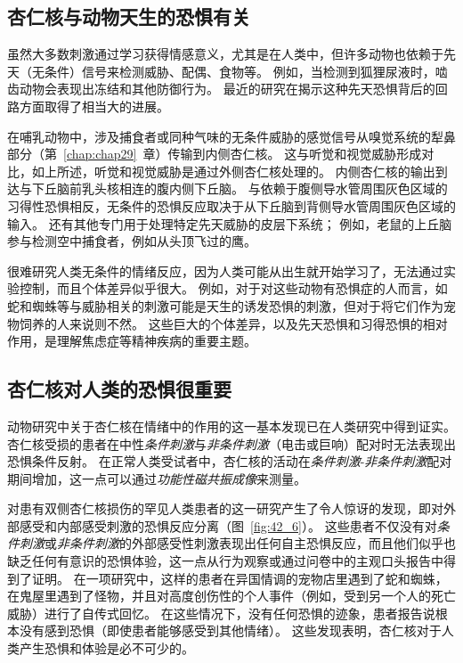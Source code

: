 \subsection{杏仁核与动物天生的恐惧有关}

虽然大多数刺激通过学习获得情感意义，尤其是在人类中，但许多动物也依赖于先天（无条件）信号来检测威胁、配偶、食物等。
例如，当检测到狐狸尿液时，啮齿动物会表现出冻结和其他防御行为。
最近的研究在揭示这种先天恐惧背后的回路方面取得了相当大的进展。


在哺乳动物中，涉及捕食者或同种气味的无条件威胁的感觉信号从嗅觉系统的犁鼻部分（第~\ref{chap:chap29}~章）传输到内侧杏仁核。
这与听觉和视觉威胁形成对比，如上所述，听觉和视觉威胁是通过外侧杏仁核处理的。
内侧杏仁核的输出到达与下丘脑前乳头核相连的腹内侧下丘脑。
与依赖于腹侧导水管周围灰色区域的习得性恐惧相反，无条件的恐惧反应取决于从下丘脑到背侧导水管周围灰色区域的输入。
还有其他专门用于处理特定先天威胁的皮层下系统；
例如，老鼠的上丘脑参与检测空中捕食者，例如从头顶飞过的鹰。


很难研究人类无条件的情绪反应，因为人类可能从出生就开始学习了，无法通过实验控制，而且个体差异似乎很大。
例如，对于对这些动物有恐惧症的人而言，如蛇和蜘蛛等与威胁相关的刺激可能是天生的诱发恐惧的刺激，但对于将它们作为宠物饲养的人来说则不然。
这些巨大的个体差异，以及先天恐惧和习得恐惧的相对作用，是理解焦虑症等精神疾病的重要主题。



\subsection{杏仁核对人类的恐惧很重要}

动物研究中关于杏仁核在情绪中的作用的这一基本发现已在人类研究中得到证实。
杏仁核受损的患者在中性\textit{条件刺激}与\textit{非条件刺激}（电击或巨响）配对时无法表现出恐惧条件反射。
在正常人类受试者中，杏仁核的活动在\textit{条件刺激}-\textit{非条件刺激}配对期间增加，这一点可以通过\textit{功能性磁共振成像}来测量。


对患有双侧杏仁核损伤的罕见人类患者的这一研究产生了令人惊讶的发现，即对外部感受和内部感受刺激的恐惧反应分离（图~\ref{fig:42_6}）。
这些患者不仅没有对\textit{条件刺激}或\textit{非条件刺激}的外部感受性刺激表现出任何自主恐惧反应，而且他们似乎也缺乏任何有意识的恐惧体验，这一点从行为观察或通过问卷中的主观口头报告中得到了证明。
在一项研究中，这样的患者在异国情调的宠物店里遇到了蛇和蜘蛛，在鬼屋里遇到了怪物，并且对高度创伤性的个人事件（例如，受到另一个人的死亡威胁）进行了自传式回忆。
在这些情况下，没有任何恐惧的迹象，患者报告说根本没有感到恐惧（即使患者能够感受到其他情绪）。
这些发现表明，杏仁核对于人类产生恐惧和体验是必不可少的。


